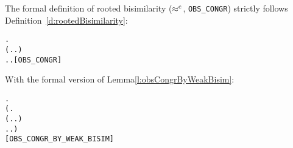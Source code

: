The formal definition of rooted bisimilarity ($\mathrel{\approx^{\rm{c}}}$, \texttt{OBS_CONGR}) strictly
follows Definition~\ref{d:rootedBisimilarity}:
\begin{alltt}
 \HOLSymConst{\HOLTokenObsCongr}  \HOLSymConst{\HOLTokenEquiv{}}
\HOLSymConst{\HOLTokenForall{}}.
    (\HOLSymConst{\HOLTokenForall{}}.  \HOLTokenTransBegin{}\HOLTokenTransEnd {} \HOLSymConst{\HOLTokenImp{}} \HOLSymConst{\HOLTokenExists{}}.  \HOLTokenWeakTransBegin{}\HOLTokenWeakTransEnd {} \HOLSymConst{\HOLTokenConj{}}  \HOLSymConst{\HOLTokenWeakEQ} ) \HOLSymConst{\HOLTokenConj{}}
    \HOLSymConst{\HOLTokenForall{}}.  \HOLTokenTransBegin{}\HOLTokenTransEnd {} \HOLSymConst{\HOLTokenImp{}} \HOLSymConst{\HOLTokenExists{}}.  \HOLTokenWeakTransBegin{}\HOLTokenWeakTransEnd {} \HOLSymConst{\HOLTokenConj{}}  \HOLSymConst{\HOLTokenWeakEQ} \hfill{[OBS_CONGR]}
\end{alltt}
With the formal version of Lemma\ref{l:obsCongrByWeakBisim}:
\begin{alltt}
\HOLTokenTurnstile{}   \HOLSymConst{\HOLTokenImp{}}
   \HOLSymConst{\HOLTokenForall{}} .
       (\HOLSymConst{\HOLTokenForall{}}.
            (\HOLSymConst{\HOLTokenForall{}}.  \HOLTokenTransBegin{}\HOLTokenTransEnd {} \HOLSymConst{\HOLTokenImp{}} \HOLSymConst{\HOLTokenExists{}}.  \HOLTokenWeakTransBegin{}\HOLTokenWeakTransEnd {} \HOLSymConst{\HOLTokenConj{}}   ) \HOLSymConst{\HOLTokenConj{}}
            \HOLSymConst{\HOLTokenForall{}}.  \HOLTokenTransBegin{}\HOLTokenTransEnd {} \HOLSymConst{\HOLTokenImp{}} \HOLSymConst{\HOLTokenExists{}}.  \HOLTokenWeakTransBegin{}\HOLTokenWeakTransEnd {} \HOLSymConst{\HOLTokenConj{}}   ) \HOLSymConst{\HOLTokenImp{}}
        \HOLSymConst{\HOLTokenObsCongr} \hfill{[OBS_CONGR_BY_WEAK_BISIM]}
\end{alltt}

